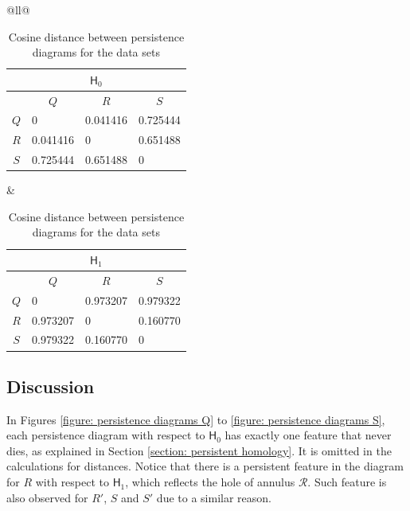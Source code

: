 \documentclass[sn-mathphys-num]{sn-jnl}%
\theoremstyle{thmstyleone}%
\theoremstyle{thmstyletwo}%
\theoremstyle{thmstylethree}%
\begin{document}
\begin{table}[h]
	\centering
	\caption{Cosine distance between persistence diagrams for the data sets}
	\begin{tabular}{@{}ll@{}}
		\begin{tabular}{@{}clll@{}}
			\multicolumn{4}{c}{$\mathsf{H}_0$}                                                \\ \toprule
			& \multicolumn{1}{c}{$Q$} & \multicolumn{1}{c}{$R$} & \multicolumn{1}{c}{$S$} \\ \midrule
			$Q$ & 0                       & 0.041416                & 0.725444                \\
			$R$ & 0.041416                & 0                       & 0.651488                \\
			$S$ & 0.725444                & 0.651488                & 0                       \\ \bottomrule
		\end{tabular}
		&
		\begin{tabular}{@{}clll@{}}
			\multicolumn{4}{c}{$\mathsf{H}_1$}                                                \\ \toprule
			& \multicolumn{1}{c}{$Q$} & \multicolumn{1}{c}{$R$} & \multicolumn{1}{c}{$S$} \\ \midrule
			$Q$ & 0                       & 0.973207                & 0.979322                \\
			$R$ & 0.973207                & 0                       & 0.160770                \\
			$S$ & 0.979322                & 0.160770                & 0                       \\ \bottomrule
		\end{tabular}
	\end{tabular}
	\label{table: cosine distance}
\end{table}

\subsection{Discussion}
In Figures \ref{figure: persistence diagrams Q} to \ref{figure: persistence diagrams S}, each persistence diagram with respect to $\mathsf{H}_0$ has exactly one feature that never dies, as explained in Section \ref{section: persistent homology}. It is omitted in the calculations for distances. Notice that there is a persistent feature in the diagram for $R$ with respect to $\mathsf{H}_1$, which reflects the hole of annulus $\mathcal{R}$. Such feature is also observed for $R'$, $S$ and $S'$ due to a similar reason.
\end{document}
